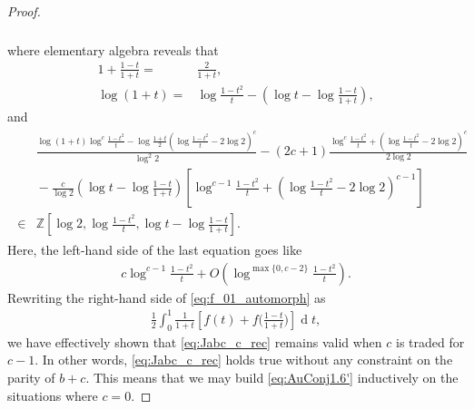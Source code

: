 \documentclass[final,notitlepage,12pt,reqno]{amsart}
\DeclareMathOperator{\D}{d}
\theoremstyle{plain}
\theoremstyle{definition}
\numberwithin{equation}{section}
\begin{document}
\begin{proof}
\begin{align}
\begin{split}
\end{split}
\end{align}where elementary algebra reveals that \begin{align}1+\frac{1-t}{1+t}={}&\frac{2}{1+t},\\
\log (1+t)={}&\log\frac{1-t^2}{t} -\left(\log t-\log\frac{1-t}{1+t}\right),
\end{align} and\begin{align}
\begin{split}&\frac{\log (1+t)\log^{c}\frac{1-t^2}{t}-\log \frac{1+t}{2}\left( \log\frac{1-t^2}{t} -2\log2\right)^{c}}{\log^{2}2}-(2c+1)\frac{\log^{c}\frac{1-t^2}{t}+\left( \log\frac{1-t^2}{t} -2\log2\right)^{c}}{2\log2}\\&{}-\frac{c}{\log2}\left( \log t-\log\frac{1-t}{1+t} \right)\left[ \log^{c-1}\frac{1-t^2}{t}+\left( \log\frac{1-t^2}{t} -2\log2\right)^{c-1} \right]\\\in{}&\mathbb Z\left[ \log2,\log\frac{1-t^2}{t},\log t-\log\frac{1-t}{1+t}\right].
\end{split}
\end{align}Here,  the left-hand side of the last equation goes like \begin{align}
c\log^{c-1}\frac{1-t^2}{t}+O\left( \log^{\max\{0,c-2\}}\frac{1-t^2}{t}\right).
\end{align}
Rewriting the right-hand side of \eqref{eq:f_01_automorph} as\begin{align}\frac12
\int_{0}^1\frac{1}{1+t}\left[f(t)+f\bigg(\frac{1-t}{1+t}\bigg) \right]\D t,
\end{align}
we have effectively shown that \eqref{eq:Jabc_c_rec} remains valid when $c$ is traded for $c-1$. In other words,  \eqref{eq:Jabc_c_rec} holds true without any constraint on the parity of    $ b+c$. This means that we may build \eqref{eq:AuConj1.6'} inductively on the situations where $c=0$.


\end{proof}
\end{document}
